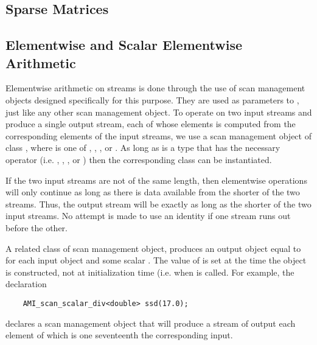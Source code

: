 
\tobewritten


\subsection{Sparse Matrices}


\tobewritten

\subsection{Elementwise and Scalar Elementwise Arithmetic}


Elementwise arithmetic on streams is done through the use of scan
management objects designed specifically for this purpose.  They are
used as parameters to , just like any other scan
management object.  To operate on two input streams and produce a
single output stream, each of whose elements is computed from the
corresponding elements of the input streams, we use a scan management
object of class , where  is one of
, , , or .  As long as
 is a type that has the necessary operator (i.e. \myverb{+},
\myverb{-}, \myverb{*}, or \myverb{/}) then the corresponding class
 can be instantiated.

If the two input streams are not of the same length, then elementwise
operations will only continue as long as there is data available from
the shorter of the two streams.  Thus, the output stream will be
exactly as long as the shorter of the two input streams.  No attempt
is made to use an identity if one stream runs out before the other.

A related class of scan management object,
 produces an output object equal to
 for each input object  and some scalar .
The value of  is set at the time the object is constructed,
not at initialization time (i.e. when  is called.
For example, the declaration
\begin{verbatim}
    AMI_scan_scalar_div<double> ssd(17.0);
\end{verbatim}
declares a scan management object that will produce a stream of output
each element of which is one seventeenth the corresponding input.

